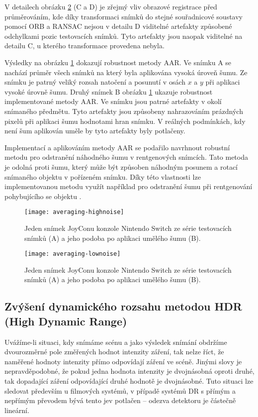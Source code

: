 V detailech obrázku \ref{fig:averaging-low-noise} (C a D) je zřejmý vliv obrazové registrace před průměrováním, kde díky transformaci snímků do stejné  souřadnicové soustavy pomocí ORB a RANSAC nejsou v detailu D viditelné artefakty způsobené odchylkami pozic testovacích snímků. Tyto artefakty jsou naopak viditelné na detailu C, u kterého transformace provedena nebyla.

Výsledky na obrázku \ref{fig:averaging-high-noise} dokazují robustnost metody AAR. Ve snímku A se nachází průměr všech snímků na který byla aplikována vysoká úroveň šumu. Ze snímku je patrný veliký rozsah natočení a posunutí v osách $x$ a $y$ při aplikaci vysoké úrovně šumu. Druhý snímek B obrázku \ref{fig:averaging-high-noise} ukazuje robustnost implementované metody AAR. Ve snímku jsou patrné artefakty v okolí snímaného předmětu. Tyto artefakty jsou způsobeny nahrazováním prázdných pixelů při aplikaci šumu hodnotami hran snímku. V reálných podmínkách, kdy není šum aplikován uměle by tyto artefakty byly potlačeny.

Implementací a aplikováním metody AAR se podařilo navrhnout robustní metodu pro odstranění náhodného šumu v rentgenových snímcích. Tato metoda je odolná proti šumu, který může být způsoben náhodným posunem a rotací snímaného objektu v pořízeném snímku. Díky této vlastnosti lze implementovanou metodu využít například pro odstranění šumu při rentgenování pohybujícího se objektu  .

\begin{figure}[htb]
\centering
\texttt{[image: averaging-highnoise]}
\caption{Jeden snímek JoyConu konzole Nintendo Switch ze série testovacích snímků (A) a jeho podoba po aplikaci umělého šumu (B).}
\label{fig:averaging-high-noise}
\end{figure}

\begin{figure}[htb]
\centering
\texttt{[image: averaging-lownoise]}
\caption{Jeden snímek JoyConu konzole Nintendo Switch ze série testovacích snímků (A) a jeho podoba po aplikaci umělého šumu (B).}
\label{fig:averaging-low-noise}
\end{figure}
\clearpage

\subsection{Zvýšení dynamického rozsahu metodou HDR (High Dynamic Range)}
Uvážíme-li situaci, kdy snímáme scénu a jako výsledek snímání obdržíme dvourozměrné pole změřených hodnot intenzity záření, tak nelze říct, že naměřené hodnoty intenzity přímo odpovídají záření ve scéně. Jinými slovy je nepravděpodobné, že pokud jedna hodnota intenzity je dvojnásobná oproti druhé, tak dopadající záření odpovídající druhé hodnotě je dvojnásobné. Tuto situaci lze sledovat především u filmových systémů, v případě systémů DR s přímým a nepřímým převodem bývá tento jev potlačen -- odezva detektoru je částečně lineární.

